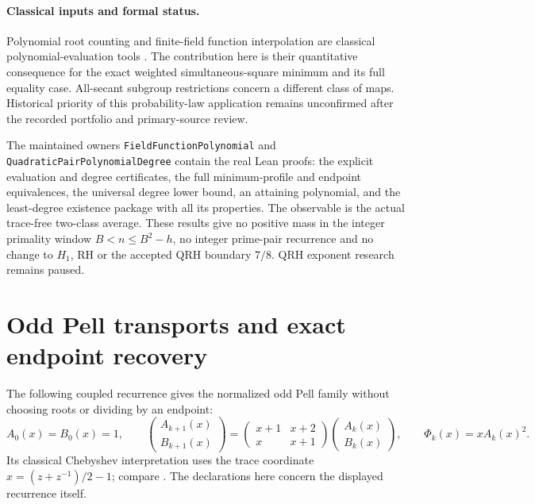 \documentclass[11pt]{article}
\begin{document}
\paragraph{Classical inputs and formal status.}
Polynomial root counting and finite-field function interpolation
are classical polynomial-evaluation tools
\cite{ReedSolomonPolynomialCodes}.
The contribution here is their quantitative consequence for
the exact weighted simultaneous-square minimum and its full
equality case. All-secant subgroup restrictions
\cite{CsajbokSecants} concern a different class of maps.
Historical priority of this probability-law application remains
unconfirmed after the recorded portfolio and primary-source review.

The maintained owners
\texttt{FieldFunctionPolynomial} and
\texttt{QuadraticPairPolynomialDegree} contain the real Lean proofs:
the explicit evaluation and degree certificates, the full
minimum-profile and endpoint equivalences, the universal degree
lower bound, an attaining polynomial, and the least-degree
existence package with all its properties.
The observable is the actual trace-free two-class average.
These results give no positive mass in the integer primality
window \(B<n\le B^2-h\), no integer prime-pair recurrence and
no change to \(H_1\), RH or the accepted QRH boundary \(7/8\).
QRH exponent research remains paused.

\section{Odd Pell transports and exact endpoint recovery}
\label{sec:odd-pell-algebraic-input}
The following coupled recurrence gives the normalized odd Pell family
without choosing roots or dividing by an endpoint:
\[
 A_0(x)=B_0(x)=1,\qquad
 \begin{pmatrix}A_{k+1}(x)\\B_{k+1}(x)\end{pmatrix}
 =
 \begin{pmatrix}x+1&x+2\\x&x+1\end{pmatrix}
 \begin{pmatrix}A_k(x)\\B_k(x)\end{pmatrix},\qquad
 \Phi_k(x)=xA_k(x)^2.
\]
Its classical Chebyshev interpretation uses the trace coordinate
\(x=(z+z^{-1})/2-1\); compare \cite{GassertChebyshevGraphs}.
The declarations here concern the displayed recurrence itself.
\end{document}
